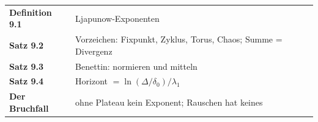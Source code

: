 \begin{merksatz}
\begin{center}
\renewcommand{\arraystretch}{1.5}
\begin{tabular}{@{}P{3.0cm}P{5.6cm}@{}}
\toprule
\textbf{Definition 9.1} & Ljapunow-Exponenten\\
\textbf{Satz 9.2} & Vorzeichen: Fixpunkt, Zyklus, Torus, Chaos; Summe = Divergenz\\
\textbf{Satz 9.3} & Benettin: normieren und mitteln\\
\textbf{Satz 9.4} & Horizont $= \ln(\Delta/\delta_0)/\lambda_1$\\
\textbf{Der Bruchfall} & ohne Plateau kein Exponent; Rauschen hat keines\\
\bottomrule
\end{tabular}
\end{center}

\begin{center}
\begin{minipage}{0.88\textwidth}
\end{minipage}
\end{center}
\end{merksatz}
